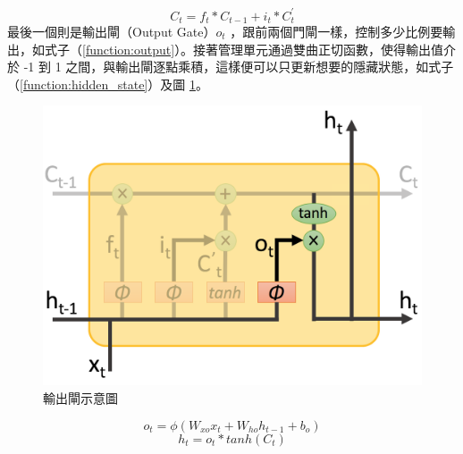 \begin{equation}
    C_t = f_t * C_{t-1} + i_t * C_t^{'} \label{function:update}
\end{equation}
最後一個則是輸出閘（Output Gate）$o_t$ ，跟前兩個門閘一樣，控制多少比例要輸出，如式子（\ref{function:output}）。接著管理單元通過雙曲正切函數，使得輸出值介於 -1 到 1 之間，與輸出閘逐點乘積，這樣便可以只更新想要的隱藏狀態，如式子（\ref{function:hidden_state}）及圖 \ref{fig:output_gate}。
\begin{figure}[h]
    \centering
    \includegraphics[scale=0.35]{images/chap2_output.png}
    \caption{輸出閘示意圖\cite{shen2016} }\label{fig:output_gate}
\end{figure}
\begin{equation}
    o_t =  \phi(W_{xo}x_t + W_{ho}h_{t-1} + b_o) \label{function:output}
\end{equation}
\begin{equation}
    h_t = o_t * tanh(C_t) \label{function:hidden_state}
\end{equation}

